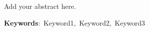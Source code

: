 Add your abstract here.

\begin{flushleft}
\mbox{{\bf Keywords}: Keyword1, Keyword2, Keyword3}
\end{flushleft}